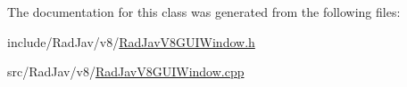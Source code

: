 The documentation for this class was generated from the following files\+:\begin{DoxyCompactItemize}
\item 
include/\+Rad\+Jav/v8/\mbox{\hyperlink{_rad_jav_v8_g_u_i_window_8h}{Rad\+Jav\+V8\+G\+U\+I\+Window.\+h}}\item 
src/\+Rad\+Jav/v8/\mbox{\hyperlink{_rad_jav_v8_g_u_i_window_8cpp}{Rad\+Jav\+V8\+G\+U\+I\+Window.\+cpp}}\end{DoxyCompactItemize}
